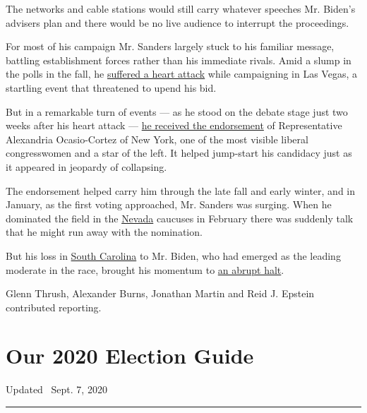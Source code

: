 The networks and cable stations would still carry whatever speeches Mr.
Biden's advisers plan and there would be no live audience to interrupt
the proceedings.

For most of his campaign Mr. Sanders largely stuck to his familiar
message, battling establishment forces rather than his immediate rivals.
Amid a slump in the polls in the fall, he
\href{https://www.nytimes3xbfgragh.onion/2019/10/04/us/politics/bernie-sanders-hospital.html}{suffered
a heart attack} while campaigning in Las Vegas, a startling event that
threatened to upend his bid.

But in a remarkable turn of events --- as he stood on the debate stage
just two weeks after his heart attack ---
\href{https://www.nytimes3xbfgragh.onion/2019/10/19/us/politics/bernie-sanders-aoc-queensbridge-park.html}{he
received the endorsement} of Representative Alexandria Ocasio-Cortez of
New York, one of the most visible liberal congresswomen and a star of
the left. It helped jump-start his candidacy just as it appeared in
jeopardy of collapsing.

The endorsement helped carry him through the late fall and early winter,
and in January, as the first voting approached, Mr. Sanders was surging.
When he dominated the field in the
\href{https://www.nytimes3xbfgragh.onion/interactive/2020/02/22/us/elections/results-nevada-caucus.html}{Nevada}
caucuses in February there was suddenly talk that he might run away with
the nomination.

But his loss in
\href{https://www.nytimes3xbfgragh.onion/interactive/2020/02/29/us/elections/results-south-carolina-primary-election.html}{South
Carolina} to Mr. Biden, who had emerged as the leading moderate in the
race, brought his momentum to
\href{https://www.nytimes3xbfgragh.onion/2020/02/29/us/politics/joe-biden-south-carolina-primary.html}{an
abrupt halt}.

Glenn Thrush, Alexander Burns, Jonathan Martin and Reid J. Epstein
contributed reporting.

\hypertarget{our-2020-election-guide}{%
\section{Our 2020 Election Guide}\label{our-2020-election-guide}}

Updated ~Sept. 7, 2020

\begin{center}\rule{0.5\linewidth}{\linethickness}\end{center}

